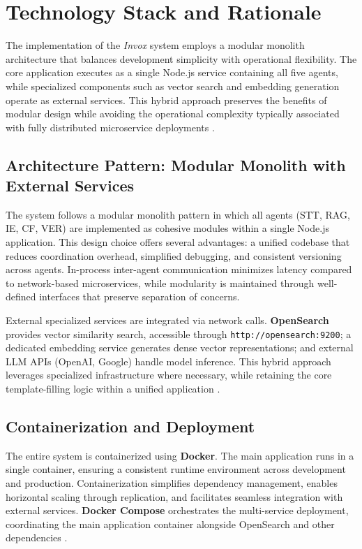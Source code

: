 \section{Technology Stack and Rationale}
\label{sec:tech-stack}

The implementation of the \textit{Invox} system employs a modular monolith architecture that balances development simplicity with operational flexibility. The core application executes as a single Node.js service containing all five agents, while specialized components such as vector search and embedding generation operate as external services. This hybrid approach preserves the benefits of modular design while avoiding the operational complexity typically associated with fully distributed microservice deployments \cite{fowler2015monolith,microservices_newman}.

\subsection*{Architecture Pattern: Modular Monolith with External Services}

The system follows a modular monolith pattern in which all agents (STT, RAG, IE, CF, VER) are implemented as cohesive modules within a single Node.js application. This design choice offers several advantages: a unified codebase that reduces coordination overhead, simplified debugging, and consistent versioning across agents. In-process inter-agent communication minimizes latency compared to network-based microservices, while modularity is maintained through well-defined interfaces that preserve separation of concerns.

External specialized services are integrated via network calls. \textbf{OpenSearch} provides vector similarity search, accessible through \texttt{http://opensearch:9200}; a dedicated embedding service generates dense vector representations; and external LLM APIs (OpenAI, Google) handle model inference. This hybrid approach leverages specialized infrastructure where necessary, while retaining the core template-filling logic within a unified application \cite{opensearch_knn}.

\subsection*{Containerization and Deployment}

The entire system is containerized using \textbf{Docker}. The main application runs in a single container, ensuring a consistent runtime environment across development and production. Containerization simplifies dependency management, enables horizontal scaling through replication, and facilitates seamless integration with external services. \textbf{Docker Compose} orchestrates the multi-service deployment, coordinating the main application container alongside OpenSearch and other dependencies \cite{docker_docs}.

